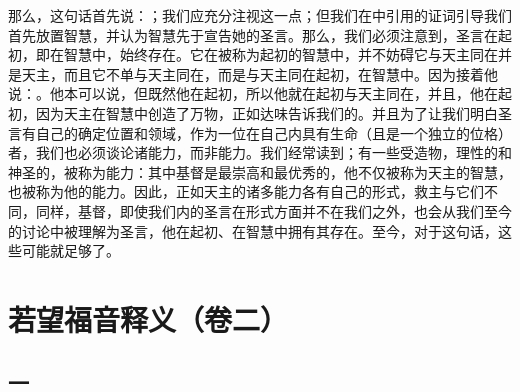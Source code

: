 那么，这句话首先说：；我们应充分注视这一点；但我们在中引用的证词引导我们首先放置智慧，并认为智慧先于宣告她的圣言。那么，我们必须注意到，圣言在起初，即在智慧中，始终存在。它在被称为起初的智慧中，并不妨碍它与天主同在并是天主，而且它不单与天主同在，而是与天主同在起初，在智慧中。因为接着他说：。他本可以说，但既然他在起初，所以他就在起初与天主同在，并且，他在起初，因为天主在智慧中创造了万物，正如达味告诉我们的。并且为了让我们明白圣言有自己的确定位置和领域，作为一位在自己内具有生命（且是一个独立的位格）者，我们也必须谈论诸能力，而非能力。我们经常读到；有一些受造物，理性的和神圣的，被称为能力：其中基督是最崇高和最优秀的，他不仅被称为天主的智慧，也被称为他的能力。因此，正如天主的诸多能力各有自己的形式，救主与它们不同，同样，基督，即使我们内的圣言在形式方面并不在我们之外，也会从我们至今的讨论中被理解为圣言，他在起初、在智慧中拥有其存在。至今，对于这句话，这些可能就足够了。\par



\section{若望福音释义（卷二）}


\subsection{一}

